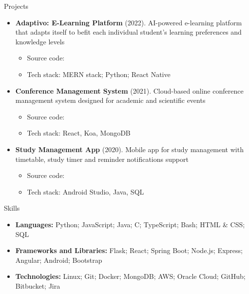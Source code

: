 \documentclass[garamond, a4paper]{modest-cv}
\begin{document}
	\begin{cvsection}{Projects}
		\begin{cvsubsection}{}{}{}{}
			\begin{itemize}
				\item \textbf{Adaptivo: E-Learning Platform} (2022). AI-powered e-learning platform that adapts itself to befit each individual student's learning preferences and knowledge levels
				\begin{itemize}
					\item Source code: \small {}
					\item Tech stack: MERN stack; Python; React Native
				\end{itemize}
				
				\item \textbf{Conference Management System} (2021). Cloud-based online conference management system designed for academic and scientific events
				\begin{itemize}
					\item Source code: \small {}
					\item Tech stack: React, Koa, MongoDB
				\end{itemize}
				
				\item \textbf{Study Management App} (2020). Mobile app for study management with timetable, study timer and reminder notifications support
				\begin{itemize}
					\item Source code: \small {}
					\item Tech stack: Android Studio, Java, SQL
				\end{itemize}
			\end{itemize}
		\end{cvsubsection}
	\end{cvsection}

	\begin{cvsection}{Skills}
		\begin{cvsubsection}{}{}{}{}
			\begin{itemize}
				\item \textbf{Languages:} Python; JavaScript; Java; C; TypeScript; Bash; HTML \& CSS; SQL
				\item \textbf{Frameworks and Libraries:} Flask; React; Spring Boot; Node.js; Express; Angular; Android; Bootstrap
				\item \textbf{Technologies:} Linux; Git; Docker; MongoDB; AWS; Oracle Cloud; GitHub; Bitbucket; Jira
			\end{itemize}
		\end{cvsubsection}
	\end{cvsection}
\end{document}
